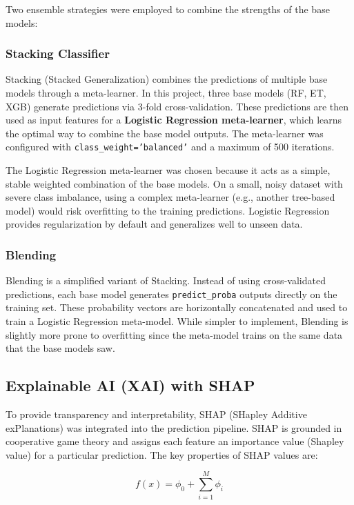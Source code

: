 \documentclass[12pt, a4paper]{article}
\begin{document}
Two ensemble strategies were employed to combine the strengths of the base models:

\subsubsection{Stacking Classifier}

Stacking (Stacked Generalization) combines the predictions of multiple base models through a meta-learner. In this project, three base models (RF, ET, XGB) generate predictions via 3-fold cross-validation. These predictions are then used as input features for a \textbf{Logistic Regression meta-learner}, which learns the optimal way to combine the base model outputs. The meta-learner was configured with \texttt{class\_weight='balanced'} and a maximum of 500 iterations.

The Logistic Regression meta-learner was chosen because it acts as a simple, stable weighted combination of the base models. On a small, noisy dataset with severe class imbalance, using a complex meta-learner (e.g., another tree-based model) would risk overfitting to the training predictions. Logistic Regression provides regularization by default and generalizes well to unseen data.

\subsubsection{Blending}

Blending is a simplified variant of Stacking. Instead of using cross-validated predictions, each base model generates \texttt{predict\_proba} outputs directly on the training set. These probability vectors are horizontally concatenated and used to train a Logistic Regression meta-model. While simpler to implement, Blending is slightly more prone to overfitting since the meta-model trains on the same data that the base models saw.

\subsection{Explainable AI (XAI) with SHAP}

To provide transparency and interpretability, SHAP (SHapley Additive exPlanations) was integrated into the prediction pipeline. SHAP is grounded in cooperative game theory and assigns each feature an importance value (Shapley value) for a particular prediction. The key properties of SHAP values are:

\begin{equation}
f(x) = \phi_0 + \sum_{i=1}^{M} \phi_i
\label{eq:shap}
\end{equation}
\end{document}

